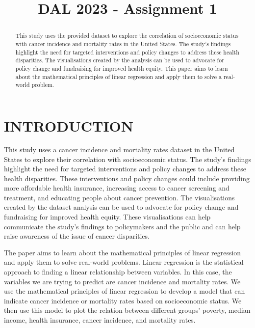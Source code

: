 \documentclass[conference]{IEEEtran}
\begin{document}
\pagestyle{plain}

\title{DAL 2023 - Assignment 1\\
{\footnotesize }

}

\author{
}

\maketitle

\begin{abstract}
This study uses the provided dataset to explore the correlation of socioeconomic status with cancer incidence and mortality rates in the United States. The study’s findings highlight the need for targeted interventions and policy changes to address these health disparities. The visualisations created by the analysis can be used to advocate for policy change and fundraising for improved health equity. This paper aims to learn about the mathematical principles of linear regression and apply them to solve a real-world problem.
\end{abstract}

\section{INTRODUCTION}
This study uses a cancer incidence and mortality rates dataset in the United States to explore their correlation with socioeconomic status. The study’s findings highlight the need for targeted interventions and policy changes to address these health disparities. These interventions and policy changes could include providing more affordable health insurance, increasing access to cancer screening and treatment, and educating people about cancer prevention. The visualisations created by the dataset analysis can be used to advocate for policy change and fundraising for improved health equity. These visualisations can help communicate the study’s findings to policymakers and the public and can help raise awareness of the issue of cancer disparities.

The paper aims to learn about the mathematical principles of linear regression and apply them to solve real-world problems. Linear regression is the statistical approach to finding a linear relationship between variables. In this case, the variables we are trying to predict are cancer incidence and mortality rates. We use the mathematical principles of linear regression to develop a model that can indicate cancer incidence or mortality rates based on socioeconomic status. We then use this model to plot the relation between different groups’ poverty, median income, health insurance, cancer incidence, and mortality rates.
\end{document}
